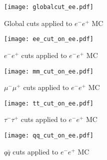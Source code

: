 \begin{figure}[h!]
    \texttt{[image: globalcut\_ee.pdf]}
    \caption{Global cuts applied to $e^-e^+$ MC}
    \label{fig:global-ee}
\end{figure}

\begin{figure}[h!]
    \texttt{[image: ee\_cut\_on\_ee.pdf]}
    \caption{$e^-e^+$ cuts applied to $e^-e^+$ MC}
    \label{fig:eecutee}
\end{figure}

\begin{figure}[h!]
    \texttt{[image: mm\_cut\_on\_ee.pdf]}
    \caption{$\mu^-\mu^+$ cuts applied to $e^-e^+$ MC}
    \label{fig:mmcutee}
\end{figure}

\begin{figure}[h!]
    \texttt{[image: tt\_cut\_on\_ee.pdf]}
    \caption{$\tau^-\tau^+$ cuts applied to $e^-e^+$ MC}
    \label{fig:ttcutee}
\end{figure}

\begin{figure}[h!]
    \texttt{[image: qq\_cut\_on\_ee.pdf]}
    \caption{$q\bar{q}$ cuts applied to $e^-e^+$ MC}
    \label{fig:qqcutee}
\end{figure}